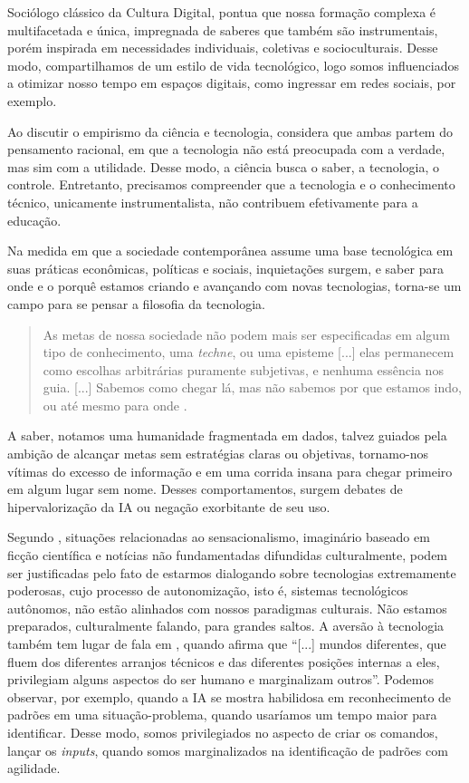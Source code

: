 \documentclass[portuguese]{textolivre}
\begin{document}
Sociólogo clássico da Cultura Digital, \textcite{levy1993tecnologias} pontua que nossa formação complexa é multifacetada e única, impregnada de saberes que também são instrumentais, porém inspirada em necessidades individuais, coletivas e socioculturais. Desse modo, compartilhamos de um estilo de vida tecnológico, logo somos influenciados a otimizar nosso tempo em espaços digitais, como ingressar em redes sociais, por exemplo.

Ao discutir o empirismo da ciência e tecnologia, \textcite{feenberg2003} considera que ambas partem do pensamento racional, em que a tecnologia não está preocupada com a verdade, mas sim com a utilidade. Desse modo, a ciência busca o saber, a tecnologia, o controle. Entretanto, precisamos compreender que a tecnologia e o conhecimento técnico, unicamente instrumentalista, não contribuem efetivamente para a educação.

Na medida em que a sociedade contemporânea assume uma base tecnológica em suas práticas econômicas, políticas e sociais, inquietações surgem, e saber para onde e o porquê estamos criando e avançando com novas tecnologias, torna-se um campo para se pensar a filosofia da tecnologia.

\begin{quote}
    As metas de nossa sociedade não podem mais ser especificadas em algum tipo de conhecimento, uma \emph{techne}, ou uma episteme [...] elas permanecem como escolhas arbitrárias puramente subjetivas, e nenhuma essência nos guia. [...] Sabemos como chegar lá, mas não sabemos por que estamos indo, ou até mesmo para onde \cite[p. 5]{feenberg2003}.
\end{quote}

A saber, notamos uma humanidade fragmentada em dados, talvez guiados pela ambição de alcançar metas sem estratégias claras ou objetivas, tornamo-nos vítimas do excesso de informação e em uma corrida insana para chegar primeiro em algum lugar sem nome. Desses comportamentos, surgem debates de hipervalorização da IA ou negação exorbitante de seu uso. 

Segundo \textcite{santaella2023inteligencia}, situações relacionadas ao sensacionalismo, imaginário baseado em ficção científica e notícias não fundamentadas difundidas culturalmente, podem ser justificadas pelo fato de estarmos dialogando sobre tecnologias extremamente poderosas, cujo processo de autonomização, isto é, sistemas tecnológicos autônomos, não estão alinhados com nossos paradigmas culturais. Não estamos preparados, culturalmente falando, para grandes saltos. A aversão à tecnologia também tem lugar de fala em \textcite[p. 4]{feenberg2004}, quando afirma que “[...] mundos diferentes, que fluem dos diferentes arranjos técnicos e das diferentes posições internas a eles, privilegiam alguns aspectos do ser humano e marginalizam outros”. Podemos observar, por exemplo, quando a IA se mostra habilidosa em reconhecimento de padrões em uma situação-problema, quando usaríamos um tempo maior para identificar. Desse modo, somos privilegiados no aspecto de criar os comandos, lançar os \emph{inputs}, quando somos marginalizados na identificação de padrões com agilidade.
\end{document}
